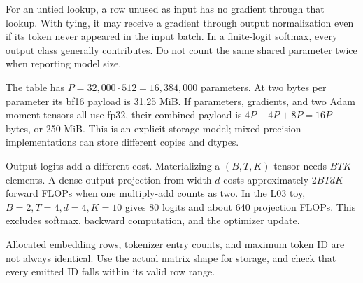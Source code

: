 
For an untied lookup, a row unused as input has no gradient through that
lookup. With tying, it may receive a gradient through output normalization
even if its token never appeared in the input batch. In a finite-logit
softmax, every output class generally contributes. Do not count the same
shared parameter twice when reporting model size.


The table has $P=32{,}000\cdot512=16{,}384{,}000$ parameters.
At two bytes per parameter its bf16 payload is 31.25 MiB. If parameters,
gradients, and two Adam moment tensors all use fp32, their combined payload is
$4P+4P+8P=16P$ bytes, or 250 MiB. This is an explicit storage model;
mixed-precision implementations can store different copies and dtypes.

Output logits add a different cost. Materializing a $(B,T,K)$ tensor needs
$BTK$ elements. A dense output projection from width $d$ costs approximately
$2BTdK$ forward FLOPs when one multiply-add counts as two. In the L03 toy,
$B=2,T=4,d=4,K=10$ gives 80 logits and about 640 projection FLOPs.
This excludes softmax, backward computation, and the optimizer update.

Allocated embedding rows, tokenizer entry counts, and maximum token ID are
not always identical. Use the actual matrix shape for storage, and check
that every emitted ID falls within its valid row range.

